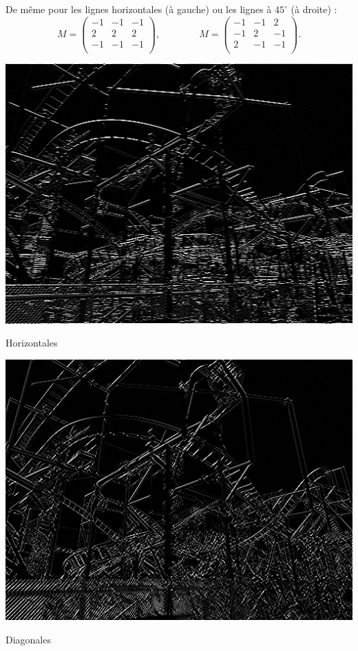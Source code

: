\documentclass[11pt,class=report,crop=false]{standalone}
\begin{document}
De même pour les lignes horizontales (à gauche) ou les lignes à $45^\circ$ (à droite) :
$$M = 
\begin{pmatrix}
-1&-1&-1\\
2&2&2\\
-1&-1&-1\\
\end{pmatrix},\qquad \qquad
M=\begin{pmatrix}
-1&-1&2\\
-1&2&-1\\
2&-1&-1\\
\end{pmatrix}.
$$

\begin{center}
	\begin{minipage}{0.45\textwidth}\center
	 \includegraphics[scale=\myscale,scale=0.4]{figures/image_horizontales_apres}
	
	Horizontales
    \end{minipage}
	\begin{minipage}{0.45\textwidth}\center
	 \includegraphics[scale=\myscale,scale=0.4]{figures/image_diagonales_apres}
	
	Diagonales
    \end{minipage}        	
\end{center}
\end{document}
